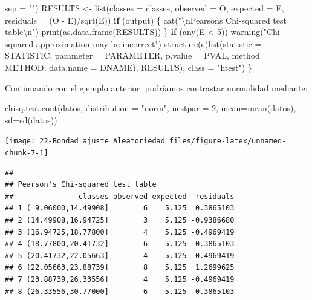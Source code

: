 \documentclass[
]{book}
\newenvironment{Shaded}{\begin{snugshade}}{\end{snugshade}}
\newcommand{\AttributeTok}[1]{\textcolor[rgb]{0.77,0.63,0.00}{#1}}
\newcommand{\ControlFlowTok}[1]{\textcolor[rgb]{0.13,0.29,0.53}{\textbf{#1}}}
\newcommand{\DecValTok}[1]{\textcolor[rgb]{0.00,0.00,0.81}{#1}}
\newcommand{\FunctionTok}[1]{\textcolor[rgb]{0.00,0.00,0.00}{#1}}
\newcommand{\NormalTok}[1]{#1}
\newcommand{\OtherTok}[1]{\textcolor[rgb]{0.56,0.35,0.01}{#1}}
\newcommand{\SpecialCharTok}[1]{\textcolor[rgb]{0.00,0.00,0.00}{#1}}
\newcommand{\StringTok}[1]{\textcolor[rgb]{0.31,0.60,0.02}{#1}}
\theoremstyle{break}
\theoremstyle{definition}
\theoremstyle{definition}
\theoremstyle{definition}
\theoremstyle{definition}
\theoremstyle{remark}
\begin{document}
\begin{Shaded}
\begin{Highlighting}[]
        \AttributeTok{sep =} \StringTok{""}\NormalTok{)}
\NormalTok{    RESULTS }\OtherTok{\textless{}{-}} \FunctionTok{list}\NormalTok{(}\AttributeTok{classes =}\NormalTok{ classes, }\AttributeTok{observed =}\NormalTok{ O, }\AttributeTok{expected =}\NormalTok{ E, }\AttributeTok{residuals =}\NormalTok{ (O }\SpecialCharTok{{-}} 
\NormalTok{        E)}\SpecialCharTok{/}\FunctionTok{sqrt}\NormalTok{(E))}
    \ControlFlowTok{if}\NormalTok{ (output) \{}
        \FunctionTok{cat}\NormalTok{(}\StringTok{"}\SpecialCharTok{\textbackslash{}n}\StringTok{Pearson\textquotesingle{}s Chi{-}squared test table}\SpecialCharTok{\textbackslash{}n}\StringTok{"}\NormalTok{)}
        \FunctionTok{print}\NormalTok{(}\FunctionTok{as.data.frame}\NormalTok{(RESULTS))}
\NormalTok{    \}}
    \ControlFlowTok{if}\NormalTok{ (}\FunctionTok{any}\NormalTok{(E }\SpecialCharTok{\textless{}} \DecValTok{5}\NormalTok{)) }
        \FunctionTok{warning}\NormalTok{(}\StringTok{"Chi{-}squared approximation may be incorrect"}\NormalTok{)}
    \FunctionTok{structure}\NormalTok{(}\FunctionTok{c}\NormalTok{(}\FunctionTok{list}\NormalTok{(}\AttributeTok{statistic =}\NormalTok{ STATISTIC, }\AttributeTok{parameter =}\NormalTok{ PARAMETER, }\AttributeTok{p.value =}\NormalTok{ PVAL, }
        \AttributeTok{method =}\NormalTok{ METHOD, }\AttributeTok{data.name =}\NormalTok{ DNAME), RESULTS), }\AttributeTok{class =} \StringTok{"htest"}\NormalTok{)}
\NormalTok{\}}
\end{Highlighting}
\end{Shaded}

Continuando con el ejemplo anterior, podríamos contrastar normalidad mediante:

\begin{Shaded}
\begin{Highlighting}[]
\FunctionTok{chisq.test.cont}\NormalTok{(datos, }\AttributeTok{distribution =} \StringTok{"norm"}\NormalTok{, }\AttributeTok{nestpar =} \DecValTok{2}\NormalTok{, }\AttributeTok{mean=}\FunctionTok{mean}\NormalTok{(datos), }\AttributeTok{sd=}\FunctionTok{sd}\NormalTok{(datos))}
\end{Highlighting}
\end{Shaded}

\begin{center}\texttt{[image: 22-Bondad\_ajuste\_Aleatoriedad\_files/figure-latex/unnamed-chunk-7-1]} \end{center}

\begin{verbatim}
## 
## Pearson's Chi-squared test table
##               classes observed expected  residuals
## 1 ( 9.06000,14.49908]        6    5.125  0.3865103
## 2 (14.49908,16.94725]        3    5.125 -0.9386680
## 3 (16.94725,18.77800]        4    5.125 -0.4969419
## 4 (18.77800,20.41732]        6    5.125  0.3865103
## 5 (20.41732,22.05663]        4    5.125 -0.4969419
## 6 (22.05663,23.88739]        8    5.125  1.2699625
## 7 (23.88739,26.33556]        4    5.125 -0.4969419
## 8 (26.33556,30.77000]        6    5.125  0.3865103
\end{verbatim}
\end{document}
